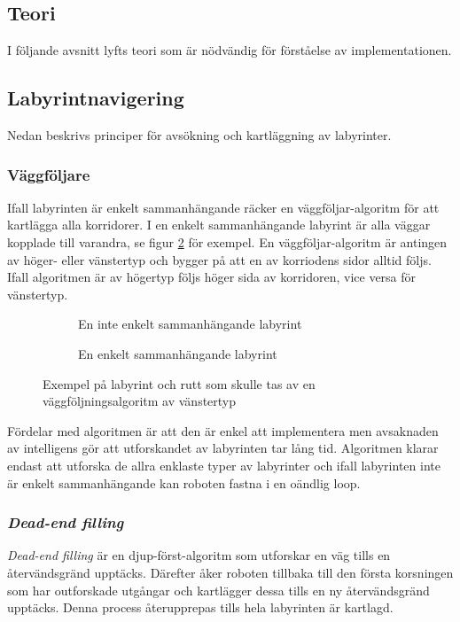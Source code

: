 \documentclass[11pt]{article}
\begin{document}
\begin{flushleft}
\pagebreak

\section{Teori}
I följande avsnitt lyfts teori som är nödvändig för förståelse av implementationen.

\subsection{Labyrintnavigering}
Nedan beskrivs principer för avsökning och kartläggning av labyrinter.

\subsubsection{Väggföljare}
Ifall labyrinten är enkelt sammanhängande räcker en väggföljar-algoritm för att kartlägga alla korridorer. I en enkelt sammanhängande labyrint är alla väggar kopplade till varandra, se figur \ref{maze} för exempel. En väggföljar-algoritm är antingen av höger- eller vänstertyp och bygger på att en av korriodens sidor alltid följs. Ifall algoritmen är av högertyp följs höger sida av korridoren, vice versa för vänstertyp.

\begin{figure}[htbp]
	\centering
	\begin{subfigure}{.5\linewidth}
		\centering
		\noindent\resizebox{.5\textwidth}{!}{
			}
		\caption{En inte enkelt sammanhängande labyrint}	
		\label{non-connected}
	\end{subfigure}%
	\begin{subfigure}{.5\linewidth}
		\centering
		\noindent\resizebox{.5\textwidth}{!}{
			}
		\caption{En enkelt sammanhängande labyrint}	
	\end{subfigure}%
	\caption{Exempel på labyrint och rutt som skulle tas av en väggföljningsalgoritm av vänstertyp}
	\label{maze}
\end{figure}%

Fördelar med algoritmen är att den är enkel att implementera men avsaknaden av intelligens gör att utforskandet av labyrinten tar lång tid. Algoritmen klarar endast att utforska de allra enklaste typer av labyrinter och ifall labyrinten inte är enkelt sammanhängande kan roboten fastna i en oändlig loop.

\subsubsection{\emph{Dead-end filling}}
\emph{Dead-end filling} är en djup-först-algoritm som utforskar en väg tills en återvändsgränd upptäcks. Därefter åker roboten tillbaka till den första korsningen som har outforskade utgångar och kartlägger dessa tills en ny återvändsgränd upptäcks. Denna process återupprepas tills hela labyrinten är kartlagd.


\end{flushleft}
\end{document}
